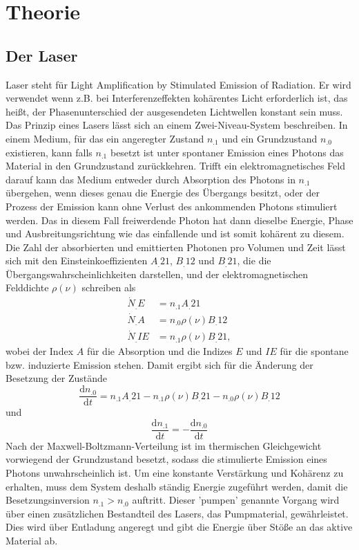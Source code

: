 \section{Theorie}
\label{sec:Theorie}

\subsection{Der Laser}
Laser steht für Light Amplification by Stimulated Emission of Radiation. Er wird verwendet wenn z.B. bei Interferenzeffekten kohärentes Licht erforderlich ist, das heißt, der Phasenunterschied der ausgesendeten Lichtwellen konstant sein muss.\\
Das Prinzip eines Lasers lässt sich an einem Zwei-Niveau-System beschreiben.
In einem Medium, für das ein angeregter Zustand $n_.1$ und ein Grundzustand $n_.0$ existieren, kann falls $n_.1$ besetzt ist unter spontaner Emission eines Photons das Material in den Grundzustand zurückkehren.
Trifft ein elektromagnetisches Feld darauf kann das Medium entweder durch Absorption des Photons in $n_.1$ übergehen, wenn dieses genau die Energie des Übergangs besitzt, oder der Prozess der Emission kann ohne Verlust des ankommenden Photons stimuliert werden. Das in diesem Fall freiwerdende Photon hat dann dieselbe Energie, Phase und Ausbreitungsrichtung wie das einfallende und ist somit kohärent zu diesem.
Die Zahl der absorbierten und emittierten Photonen pro Volumen und Zeit lässt sich mit den Einsteinkoeffizienten $A_.{21}$, $B_.{12}$ und $B_.{21}$, die die Übergangswahrscheinlichkeiten darstellen, und der elektromagnetischen Felddichte $\rho(\nu)$ schreiben als
\begin{align*}
\dot{N}_.E&=n_.1  A_.{21}\\
\dot{N}_.A&=n_.0 \rho(\nu) B_.{12}\\
\dot{N}_.{IE}&=n_.1 \rho(\nu) B_.{21},
\end{align*}
wobei der Index $A$ für die Absorption und die Indizes $E$ und $IE$ für die spontane bzw. induzierte Emission stehen.
Damit ergibt sich für die Änderung der Besetzung der Zustände
\[
\frac{\mathrm{d}n_.0}{\mathrm{d}t}=n_.1A_.{21}-n_.1 \rho(\nu) B_.{21}-n_.0 \rho(\nu) B_.{12}
\]
und 
\[
\frac{\mathrm{d}n_.1}{\mathrm{d}t}=-\frac{\mathrm{d}n_.0}{\mathrm{d}t}
\]
Nach der Maxwell-Boltzmann-Verteilung ist im thermischen Gleichgewicht vorwiegend der Grundzustand besetzt, sodass die stimulierte Emission eines Photons unwahrscheinlich ist.
Um eine konstante Verstärkung und Kohärenz zu erhalten, muss dem System deshalb ständig Energie zugeführt werden, damit die Besetzungsinversion $n_.1>n_.0$ auftritt. Dieser 'pumpen' genannte Vorgang wird über einen zusätzlichen Bestandteil des Lasers, das Pumpmaterial, gewährleistet. Dies wird über Entladung angeregt und gibt die Energie über Stöße an das aktive Material ab.\\
